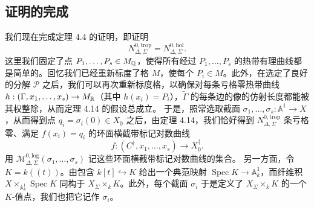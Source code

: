 \subsection{证明的完成}
我们现在完成定理 4.4 的证明，即证明
\[
N^{0,\mathrm{trop}}_{\Delta,\Sigma}=N^{0,\mathrm{hol}}_{\Delta,\Sigma}.
\]
这里我们固定了点 $P_1,\dots,P_s\in M_{\mathbb{Q}}$，使得所有经过 $P_1,\dots,P_s$ 的热带有理曲线都是简单的。回忆我们已经重新标度了格 $M$，使每个 $P_i\in M$。此外，在选定了良好的分解 $\mathcal P$ 之后，我们可以再次重新标度格，以确保对每条亏格零热带曲线 $h:(\Gamma,x_1,\dots,x_s)\to M_{\mathbb{R}}$（其中 $h(x_i)=P_i$），$\widetilde\Gamma$ 的每条边的像的仿射长度都能被其权整除，从而定理 4.14 的假设总成立。
于是，照常选取截面 $\sigma_1,\dots,\sigma_s:\mathbb{A}^1\to X$，从而得到点 $q_i=\sigma_i(0)\in X_0$ 之后，由定理 4.14，我们恰好得到 $N^{0,\mathrm{trop}}_{\Delta,\Sigma}$ 条亏格零、满足 $f(x_i)=q_i$ 的环面横截带标记对数曲线
\[
f:(C^\dagger,x_1,\dots,x_s)\to X^\dagger_0 .
\]
用 $\mathcal M^{0,\mathrm{log}}_{\Delta,\Sigma}(\sigma_1,\dots,\sigma_s)$ 记这些环面横截带标记对数曲线的集合。
另一方面，令 $K=k((t))$。由包含 $k[t]\hookrightarrow K$ 给出一个典范映射 $\operatorname{Spec}K\to\mathbb{A}^1_k$，而纤维积 $X\times_{\mathbb{A}^1_k}\operatorname{Spec}K$ 同构于 $X_\Sigma\times_k K$。此外，每个截面 $\sigma_i$ 于是定义了 $X_\Sigma\times_k K$ 的一个 $K$-值点，我们也把它记作 $\sigma_i$。

